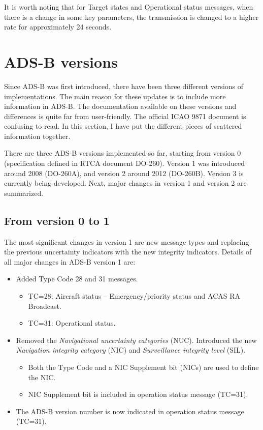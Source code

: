 It is worth noting that for Target states and Operational status messages, when there is a change in some key parameters, the transmission is changed to a higher rate for approximately 24 seconds.




\section{ADS-B versions}

Since ADS-B was first introduced, there have been three different versions of implementations. The main reason for these updates is to include more information in ADS-B. The documentation available on these versions and differences is quite far from user-friendly. The official ICAO 9871 document \cite{icao9871v1} is confusing to read. In this section, I have put the different pieces of scattered information together.

There are three ADS-B versions implemented so far, starting from version 0 (specification defined in RTCA document DO-260). Version 1 was introduced around 2008 (DO-260A), and version 2 around 2012 (DO-260B). Version 3 is currently being developed. Next, major changes in version 1 and version 2 are summarized.

\subsection{From version 0 to 1}

The most significant changes in version 1 are new message types and replacing the previous uncertainty indicators with the new integrity indicators. Details of all major changes in ADS-B version 1 are:

\begin{itemize}
  \item Added Type Code 28 and 31 messages.

  \begin{itemize}
    \item TC=28: Aircraft status -- Emergency/priority status and ACAS RA Broadcast.
    \item TC=31: Operational status.
  \end{itemize}

  \item Removed the \emph{Navigational uncertainty categories} (NUC). Introduced the new \emph{Navigation integrity category} (NIC) and \emph{Surveillance integrity level} (SIL).

  \begin{itemize}
    \item Both the Type Code and a NIC Supplement bit (NICs) are used to define the NIC.
    \item NIC Supplement bit is included in operation status message (TC=31).
  \end{itemize}

  \item The ADS-B version number is now indicated in operation status message (TC=31).
\end{itemize}

